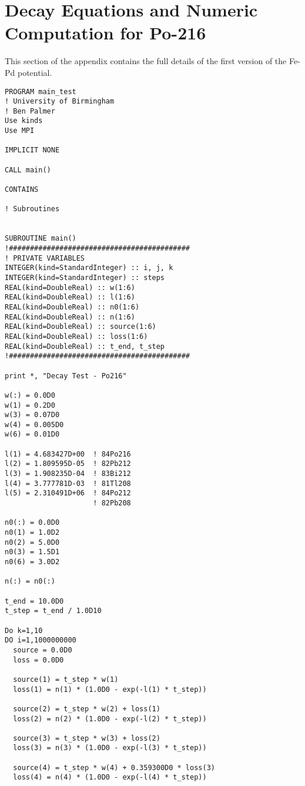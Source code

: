 \chapter{Decay Equations and Numeric Computation for Po-216}
\label{section:decaypo216numeric}


This section of the appendix contains the full details of the first version of the Fe-Pd potential.

\FloatBarrier

\begin{lstlisting}[style=sFortran,caption={Activity V1 Input File}]
PROGRAM main_test
! University of Birmingham
! Ben Palmer
Use kinds
Use MPI

IMPLICIT NONE

CALL main()

CONTAINS

! Subroutines


SUBROUTINE main()
!###########################################
! PRIVATE VARIABLES
INTEGER(kind=StandardInteger) :: i, j, k
INTEGER(kind=StandardInteger) :: steps
REAL(kind=DoubleReal) :: w(1:6)
REAL(kind=DoubleReal) :: l(1:6)
REAL(kind=DoubleReal) :: n0(1:6)
REAL(kind=DoubleReal) :: n(1:6)
REAL(kind=DoubleReal) :: source(1:6)
REAL(kind=DoubleReal) :: loss(1:6)
REAL(kind=DoubleReal) :: t_end, t_step
!###########################################

print *, "Decay Test - Po216"

w(:) = 0.0D0
w(1) = 0.2D0
w(3) = 0.07D0
w(4) = 0.005D0
w(6) = 0.01D0

l(1) = 4.683427D+00  ! 84Po216
l(2) = 1.809595D-05  ! 82Pb212
l(3) = 1.908235D-04  ! 83Bi212
l(4) = 3.777781D-03  ! 81Tl208 
l(5) = 2.310491D+06  ! 84Po212
                     ! 82Pb208

n0(:) = 0.0D0
n0(1) = 1.0D2
n0(2) = 5.0D0
n0(3) = 1.5D1
n0(6) = 3.0D2

n(:) = n0(:)

t_end = 10.0D0
t_step = t_end / 1.0D10

Do k=1,10
DO i=1,1000000000
  source = 0.0D0
  loss = 0.0D0

  source(1) = t_step * w(1)
  loss(1) = n(1) * (1.0D0 - exp(-l(1) * t_step))

  source(2) = t_step * w(2) + loss(1)
  loss(2) = n(2) * (1.0D0 - exp(-l(2) * t_step))

  source(3) = t_step * w(3) + loss(2)
  loss(3) = n(3) * (1.0D0 - exp(-l(3) * t_step))

  source(4) = t_step * w(4) + 0.359300D0 * loss(3)
  loss(4) = n(4) * (1.0D0 - exp(-l(4) * t_step))


\end{lstlisting}
